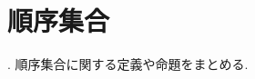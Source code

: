 \documentclass[uplatex, dvipdfmx, a4paper, 12pt, class=jsbook, crop=false]{standalone}
\begin{document}
\section{順序集合}
\label{sec:ordered-sets}

\WIP.
順序集合に関する定義や命題をまとめる.
\end{document}
